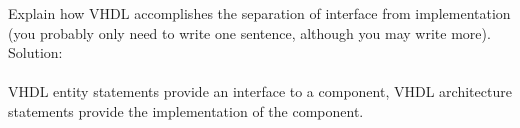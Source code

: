 Explain how VHDL accomplishes the separation of interface from implementation (you probably only need to write one sentence, although you may write more).\\

Solution: \\ \\
VHDL entity statements provide an interface to a component, VHDL architecture statements provide the implementation of the component.
